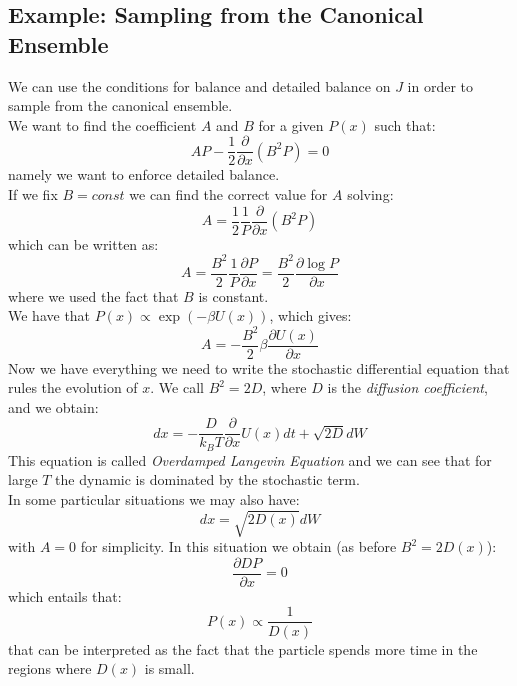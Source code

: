 \subsection{Example: Sampling from the Canonical Ensemble}
We can use the conditions for balance and detailed balance on $J$ in order to sample from the canonical ensemble.\\
We want to find the coefficient $A$ and $B$ for a given $P(x)$ such that:
\begin{equation*}
    AP - \frac{1}{2}\frac{\partial}{\partial x}\left( B^2 P \right) = 0
\end{equation*}
namely we want to enforce detailed balance.\\
If we fix $B=const$ we can find the correct value for $A$ solving:
\begin{equation*}
    A = \frac{1}{2}\frac{1}{P}\frac{\partial}{\partial x}\left( B^2 P \right)
\end{equation*}
which can be written as:
\begin{equation*}
    A = \frac{B^2}{2}\frac{1}{P}\frac{\partial P}{\partial x} = \frac{B^2}{2}\frac{\partial \log P}{\partial x}
\end{equation*}
where we used the fact that $B$ is constant.\\
We have that $P(x) \propto \exp(-\beta U(x))$, which gives:
\begin{equation*}
    A = -\frac{B^2}{2}\beta \frac{\partial U(x)}{\partial x}
\end{equation*}
Now we have everything we need to write the stochastic differential equation that rules the evolution of $x$. We call $B^2 = 2D$, where $D$ is the \textit{diffusion coefficient}, and we obtain:
\begin{equation}
    dx = -\frac{D}{k_B T}\frac{\partial}{\partial x}U(x)dt + \sqrt{2D}dW
\end{equation}
This equation is called \textit{Overdamped Langevin Equation} and we can see that for large $T$ the dynamic is dominated by the stochastic term.\\

In some particular situations we may also have:
\begin{equation*}
    dx = \sqrt{2D(x)}dW
\end{equation*}
with $A=0$ for simplicity. In this situation we obtain (as before $B^2 = 2D(x)$):
\begin{equation*}
    \frac{\partial D P}{\partial x} = 0
\end{equation*}
which entails that:
\begin{equation*}
    P(x) \propto \frac{1}{D(x)}
\end{equation*}
that can be interpreted as the fact that the particle spends more time in the regions where $D(x)$ is small.